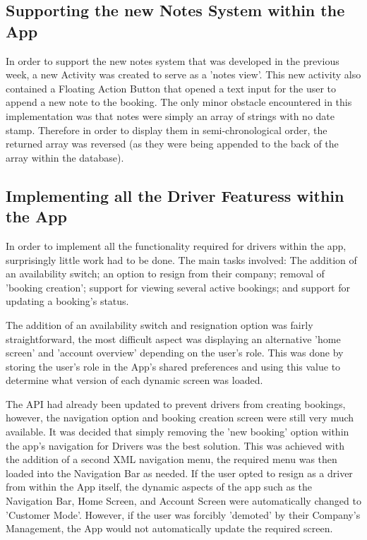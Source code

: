 \subsection{Supporting the new Notes System within the App}
In order to support the new notes system that was developed in the previous week,  a new Activity was created to serve as a 'notes view'. This new activity also contained a Floating Action Button that opened a text input for the user to append a new note to the booking. The only minor obstacle encountered in this implementation was that notes were simply an array of strings with no date stamp. Therefore in order to display them in semi-chronological order, the returned array was reversed (as they were being appended to the back of the array within the database).

\subsection{Implementing all the Driver Featuress within the App}
In order to implement all the functionality required for drivers within the app, surprisingly little work had to be done. The main tasks involved: The addition of an availability switch; an option to resign from their company; removal of 'booking creation'; support for viewing several active bookings; and support for updating a booking's status.

The addition of an availability switch and resignation option was fairly straightforward, the most difficult aspect was displaying an alternative 'home screen' and 'account overview' depending on the user's role. This was done by storing the user's role in the App's shared preferences and using this value to determine what version of each dynamic screen was loaded.

The API had already been updated to prevent drivers from creating bookings, however, the navigation option and booking creation screen were still very much available. It was decided that simply removing the 'new booking' option within the app's navigation for Drivers was the best solution. This was achieved with the addition of a second XML navigation menu, the required menu was then loaded into the Navigation Bar as needed. If the user opted to resign as a driver from within the App itself, the dynamic aspects of the app such as the Navigation Bar, Home Screen, and Account Screen were automatically changed to 'Customer Mode'. However, if the user was forcibly 'demoted' by their Company's Management, the App would not automatically update the required screen. 


